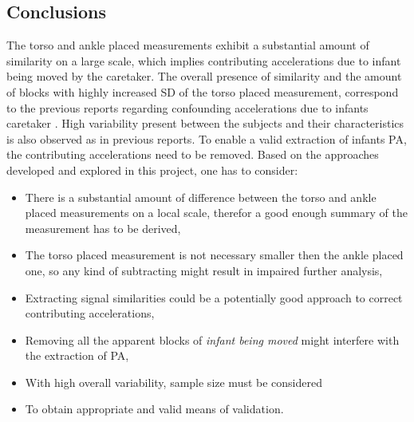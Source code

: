 \documentclass{article}
\begin{document}
{\subsection{Conclusions}
The torso and ankle placed measurements exhibit a substantial amount of similarity on a large scale, which implies contributing accelerations due to infant being moved by the caretaker. The overall presence of similarity and the amount of blocks with highly increased SD of the torso placed measurement, correspond to the previous reports regarding confounding accelerations due to infants caretaker \cite{ref1}\cite{ref5}\cite{ref6}. High variability present between the subjects and their characteristics is also observed as in previous reports. To enable a valid extraction of infants PA, the contributing accelerations need to be removed. Based on the approaches developed and explored in this project, one has to consider:
\begin{itemize}
\item There is a substantial amount of difference between the torso and ankle placed measurements on a local scale, therefor a good enough summary of the measurement has to be derived,
\item The torso placed measurement is not necessary smaller then the ankle placed one, so any kind of subtracting might result in impaired further analysis,
\item Extracting signal similarities could be a potentially good approach to correct contributing accelerations,
\item Removing all the apparent blocks of \textit{infant being moved} might interfere with the extraction of PA,
\item With high overall variability, sample size must be considered
\item To obtain appropriate and valid means of validation.
\end{itemize}

}
\newpage
\end{document}
